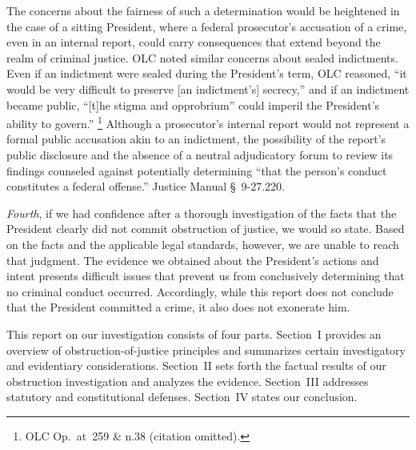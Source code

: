 The concerns about the fairness of such a determination would be heightened in the case of a sitting President, where a federal prosecutor's accusation of a crime, even in an internal report, could carry consequences that extend beyond the realm of criminal justice.
OLC noted similar concerns about sealed indictments.
Even if an indictment were sealed during the President's term, OLC reasoned, ``it would be very difficult to preserve [an indictment's] secrecy,'' and if an indictment became public, ``[t]he stigma and opprobrium'' could imperil the President's ability to govern.''%
\footnote{OLC Op.\ at~259 \& n.38 (citation omitted).}
Although a prosecutor's internal report would not represent a formal public accusation akin to an indictment, the possibility of the report's public disclosure and the absence of a neutral adjudicatory forum to review its findings counseled against potentially determining ``that the person's conduct constitutes a federal offense.''
Justice Manual \S~9-27.220.

\textit{Fourth}, if we had confidence after a thorough investigation of the facts that the President clearly did not commit obstruction of justice, we would so state.
Based on the facts and the applicable legal standards, however, we are unable to reach that judgment.
The evidence we obtained about the President's actions and intent presents difficult issues that prevent us from
conclusively determining that no criminal conduct occurred.
Accordingly, while this report does not conclude that the President committed a crime, it also does not exonerate him.

\hr

This report on our investigation consists of four parts.
Section~I provides an overview of obstruction-of-justice principles and summarizes certain investigatory and evidentiary considerations.
Section~II sets forth the factual results of our obstruction investigation and analyzes the evidence.
Section~III addresses statutory and constitutional defenses.
Section~IV states our conclusion.
